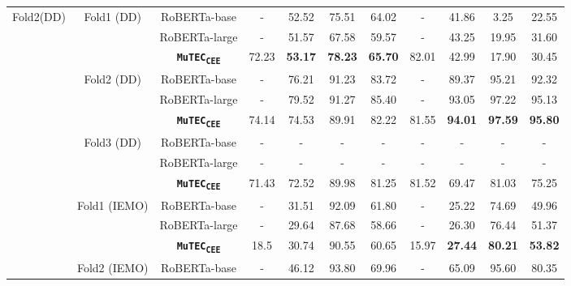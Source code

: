 \documentclass{article}
\newcommand{\subtwo}{\textbf{\texttt{MuTEC\textsubscript{CEE}}}}
\begin{document}
{\begin{table*}[t]
{\begin{tabular}{|c|c|c|c|c|c|c|c|c|c|c|}
\multirow{18}{*}{Fold2(DD)}  & \multirow{3}{*}{Fold1 (DD)}   & RoBERTa-base  & -     & 52.52 & 75.51 & 64.02 & -     & 41.86 & 3.25  & 22.55 \\ \cline{3-11} 
                             &                               & RoBERTa-large & -     & 51.57 & 67.58 & 59.57 & -     & 43.25 & 19.95 & 31.60 \\ \cline{3-11} 
                             &                               & \subtwo          & 72.23 & \textbf{53.17} & \textbf{78.23} & \textbf{65.70} & 82.01 & 42.99 & 17.90 & 30.45 \\ \cline{2-11} 
                             & \multirow{3}{*}{Fold2 (DD)}   & RoBERTa-base  & -     & 76.21 & 91.23 & 83.72 & -     & 89.37 & 95.21 & 92.32 \\ \cline{3-11} 
                             &                               & RoBERTa-large & -     & 79.52 & 91.27 & 85.40 & -     & 93.05 & 97.22 & 95.13 \\ \cline{3-11} 
                             &                               & \subtwo          & 74.14 & 74.53 & 89.91 & 82.22 & 81.55 & \textbf{94.01} & \textbf{97.59} & \textbf{95.80} \\ \cline{2-11} 
                             & \multirow{3}{*}{Fold3 (DD)}   & RoBERTa-base  & -     & -     & -     & -     & -     & -     & -     & -     \\ \cline{3-11} 
                             &                               & RoBERTa-large & -     & -     & -     & -     & -     & -     & -     & -     \\ \cline{3-11} 
                             &                               & \subtwo          & 71.43 & 72.52 & 89.98 & 81.25 & 81.52 & 69.47 & 81.03 & 75.25 \\ \cline{2-11} 
                             & \multirow{3}{*}{Fold1 (IEMO)} & RoBERTa-base  & -     & 31.51 & 92.09 & 61.80 & -     & 25.22 & 74.69 & 49.96 \\ \cline{3-11} 
                             &                               & RoBERTa-large & -     & 29.64 & 87.68 & 58.66 & -     & 26.30 & 76.44 & 51.37 \\ \cline{3-11} 
                             &                               & \subtwo          & 18.5  & 30.74 & 90.55 & 60.65 & 15.97 & \textbf{27.44} & \textbf{80.21} & \textbf{53.82} \\ \cline{2-11} 
                             & \multirow{3}{*}{Fold2 (IEMO)} & RoBERTa-base  & -     & 46.12 & 93.80 & 69.96 & -     & 65.09 & 95.60 & 80.35 \\ \cline{3-11} 

\end{tabular}}
\end{table*}}
\end{document}
